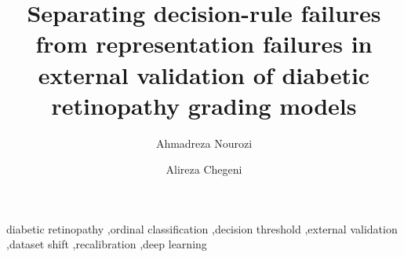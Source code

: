\documentclass[preprint,review,12pt]{elsarticle}
\begin{document}
\begin{frontmatter}

\title{Separating decision-rule failures from representation failures in external validation of
diabetic retinopathy grading models}

\author[fau]{Ahmadreza Nourozi}
\author[ut]{Alireza Chegeni}
\address[fau]{Friedrich-Alexander-Universit\"at Erlangen-N\"urnberg (FAU), Schlossplatz 4,
91054 Erlangen, Germany}
\address[ut]{School of Electrical and Computer Engineering, College of Engineering, University of
Tehran, Tehran, Iran}



\begin{keyword}
diabetic retinopathy \sep ordinal classification \sep decision threshold \sep external validation
\sep dataset shift \sep recalibration \sep deep learning
\end{keyword}

\end{frontmatter}











\clearpage

\end{document}
